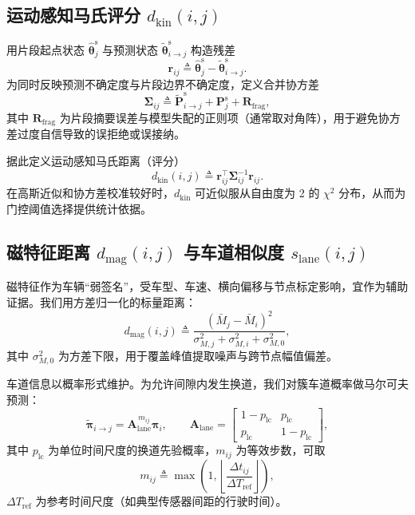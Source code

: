 \documentclass{xdupgthesis}
\begin{document}
\subsection{运动感知马氏评分 $d_{\mathrm{kin}}(i,j)$}
用片段起点状态 $\hat{\boldsymbol{\theta}}_j^{\mathrm{s}}$ 与预测状态 $\tilde{\boldsymbol{\theta}}_{i\rightarrow j}^{\mathrm{s}}$ 构造残差
\begin{equation}
	\mathbf{r}_{ij}
	\triangleq
	\hat{\boldsymbol{\theta}}_j^{\mathrm{s}}-\tilde{\boldsymbol{\theta}}_{i\rightarrow j}^{\mathrm{s}}.
	\tag{4-12}
\end{equation}
为同时反映预测不确定度与片段边界不确定度，定义合并协方差
\begin{equation}
	\mathbf{\Sigma}_{ij}
	\triangleq
	\tilde{\mathbf{P}}_{i\rightarrow j}^{\mathrm{s}}
	+
	\mathbf{P}_j^{\mathrm{s}}
	+
	\mathbf{R}_{\mathrm{frag}},
	\tag{4-13}
\end{equation}
其中 $\mathbf{R}_{\mathrm{frag}}$ 为片段摘要误差与模型失配的正则项（通常取对角阵），用于避免协方差过度自信导致的误拒绝或误接纳。

据此定义运动感知马氏距离（评分）
\begin{equation}
	d_{\mathrm{kin}}(i,j)
	\triangleq
	\mathbf{r}_{ij}^\top
	\mathbf{\Sigma}_{ij}^{-1}
	\mathbf{r}_{ij}.
	\tag{4-14}
\end{equation}
在高斯近似和协方差校准较好时，$d_{\mathrm{kin}}$ 可近似服从自由度为 2 的 $\chi^2$ 分布，从而为门控阈值选择提供统计依据。

\subsection{磁特征距离 $d_{\mathrm{mag}}(i,j)$ 与车道相似度 $s_{\mathrm{lane}}(i,j)$}
磁特征作为车辆“弱签名”，受车型、车速、横向偏移与节点标定影响，宜作为辅助证据。我们用方差归一化的标量距离：
\begin{equation}
	d_{\mathrm{mag}}(i,j)
	\triangleq
	\frac{(\bar M_j-\bar M_i)^2}{\sigma_{M,j}^2+\sigma_{M,i}^2+\sigma_{M,0}^2},
	\tag{4-15}
\end{equation}
其中 $\sigma_{M,0}^2$ 为方差下限，用于覆盖峰值提取噪声与跨节点幅值偏差。

车道信息以概率形式维护。为允许间隙内发生换道，我们对簇车道概率做马尔可夫预测：
\begin{equation}
	\tilde{\boldsymbol{\pi}}_{i\rightarrow j}
	=
	\mathbf{A}_{\mathrm{lane}}^{\,m_{ij}}\boldsymbol{\pi}_i,\qquad
	\mathbf{A}_{\mathrm{lane}}=
	\begin{bmatrix}
		1-p_{\mathrm{lc}} & p_{\mathrm{lc}}\\
		p_{\mathrm{lc}} & 1-p_{\mathrm{lc}}
	\end{bmatrix},
	\tag{4-16}
\end{equation}
其中 $p_{\mathrm{lc}}$ 为单位时间尺度的换道先验概率，$m_{ij}$ 为等效步数，可取
\begin{equation}
	m_{ij}\triangleq
	\max\!\left(1,\left\lfloor\frac{\Delta t_{ij}}{\Delta T_{\mathrm{ref}}}\right\rfloor\right),
	\tag{4-17}
\end{equation}
$\Delta T_{\mathrm{ref}}$ 为参考时间尺度（如典型传感器间距的行驶时间）。
\end{document}
